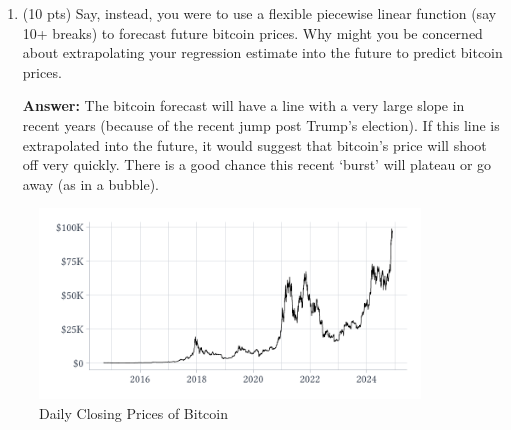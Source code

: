 \documentclass[12pt]{article}
\newcommand{\answer}[1]{{\color{blue_winged_teal}\textbf{Answer:} #1}}
\newcommand{\pts}[1]{{\color{zinc500}(#1 pts)}}
\begin{document}
\begin{enumerate}
\begin{enumerate}
    \item \pts{10} Say, instead, you were to use a flexible piecewise linear function (say 10+ breaks) to forecast future bitcoin prices. Why might you be concerned about extrapolating your regression estimate into the future to predict bitcoin prices.
    
    \answer{
      The bitcoin forecast will have a line with a very large slope in recent years (because of the recent jump post Trump's election). If this line is extrapolated into the future, it would suggest that bitcoin's price will shoot off very quickly. There is a good chance this recent `burst' will plateau or go away (as in a bubble).  
    }
  \end{enumerate}
\end{enumerate}

\bigskip
\begin{figure}[h!]
  \caption{Daily Closing Prices of Bitcoin}
  \label{fig:bitcoin}
  
  \vspace*{-2\bigskipamount}
  \begin{center}
    \includegraphics[width = 0.9\textwidth]{figures/bitcoin_raw.pdf}
  \end{center}
\end{figure}
\end{document}
